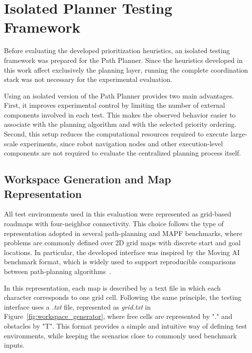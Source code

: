 \section{Isolated Planner Testing Framework}
\label{sec:isolated_planner_testing_framework}
\hspace{\parindent}
Before evaluating the developed prioritization heuristics, an isolated testing framework was
prepared for the Path Planner. Since the heuristics developed in this work affect exclusively the
planning layer, running the complete coordination stack was not necessary for the
experimental evaluation.

Using an isolated version of the Path Planner provides two main advantages. First, it improves
experimental control by limiting the number of external components involved in each test. This
makes the observed behavior easier to associate with the planning algorithm and with the selected
priority ordering. Second, this setup reduces the computational resources required to execute
large-scale experiments, since robot navigation nodes and other execution-level components are not
required to evaluate the centralized planning process itself.

\subsection{Workspace Generation and Map Representation}
\label{subsec:workspace_generation_map_representation}
\hspace{\parindent}
All test environments used in this evaluation were represented as grid-based roadmaps with
four-neighbor connectivity. This choice follows the type of representation adopted in several
path-planning and MAPF benchmarks, where problems are commonly defined over 2D grid maps
with discrete start and goal locations. In particular, the developed interface was inspired by the
Moving AI benchmark format, which is widely used to support reproducible comparisons between
path-planning algorithms~\cite{sturtevant2012benchmarks,stern2019definitions}.

In this representation, each map is described by a text file in which each character corresponds to
one grid cell. Following the same principle, the testing interface uses a \textit{.txt} file, represented
as \textit{grid.txt} in Figure~\ref{fig:workspace_generator}, where free cells are represented by
"." and obstacles by "T". This format provides a simple and intuitive way of defining test
environments, while keeping the scenarios close to commonly used benchmark inputs.

